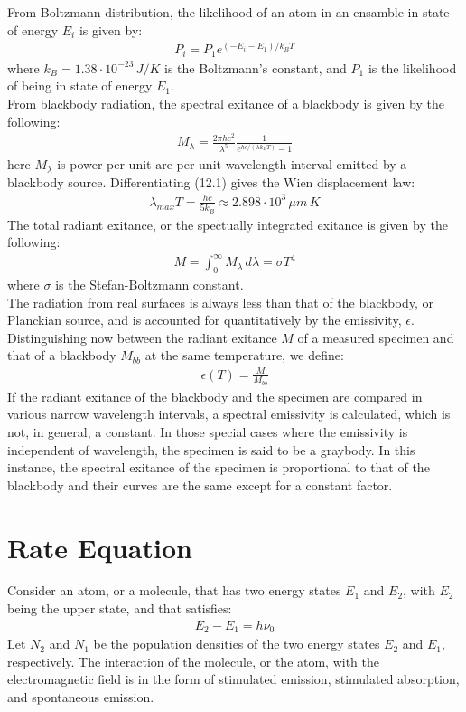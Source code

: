 \documentclass[11pt]{book}
\theoremstyle{break}
\theoremstyle{break}
\begin{document}
From Boltzmann distribution, the likelihood of an atom in an ensamble in state of energy $E_i$ is given by:
\begin{align*}
P_i = P_1 e^{(-E_i - E_1) / k_B T}
\end{align*}
where $k_B = 1.38 \cdot 10^{-23}\, J/K$ is the Boltzmann's constant, and $P_1$ is the likelihood of being in state of energy $E_1$. \\

From blackbody radiation, the spectral exitance of a blackbody is given by the following:
\begin{align}
M_{\lambda} = \frac{2\pi hc^2}{\lambda^5}\frac{1}{e^{hc/(\lambda k_B T)} - 1}
\end{align}
here $M_\lambda$ is power per unit are per unit wavelength interval emitted by a blackbody source. Differentiating (12.1) gives the Wien displacement law:
\begin{align*}
\lambda_{max} T = \frac{hc}{5k_B} \approx 2.898 \cdot 10^3 \, \mu m \,K
\end{align*}
The total radiant exitance, or the spectually integrated exitance is given by the following:
\begin{align*}
M = \int_0^{\infty}M_{\lambda}\, d\lambda = \sigma T^4
\end{align*}
where $\sigma$ is the Stefan-Boltzmann constant.\\

The radiation from real surfaces is always less than that of the blackbody, or Planckian source, and is accounted for quantitatively by the emissivity, $\epsilon$. Distinguishing now between the radiant exitance $M$ of a measured specimen and that of a blackbody $M_{bb}$ at the same temperature, we define:
\begin{align*}
\epsilon(T) = \frac{M}{M_{bb}}
\end{align*}
If the radiant exitance of the blackbody and the specimen are compared in various narrow wavelength intervals, a spectral emissivity is calculated, which is not, in general, a constant. In those special cases where the emissivity is independent of wavelength, the specimen is said to be a graybody. In this instance, the spectral exitance of the specimen is proportional to that of the blackbody and their curves are the same except for a constant factor.\\

\section[Rate Equation]{\color{red}Rate Equation\color{black}}
Consider an atom, or a molecule, that has two energy states $E_1$ and $E_2$, with $E_2$ being the upper state, and that satisfies:
\begin{align*}
E_2 - E_1 = h\nu_0
\end{align*}
Let $N_2$ and $N_1$ be the population densities of the two energy states $E_2$ and $E_1$, respectively. The interaction of the molecule, or the atom, with the electromagnetic field is in the form of stimulated emission, stimulated absorption, and spontaneous emission.\\
\end{document}
